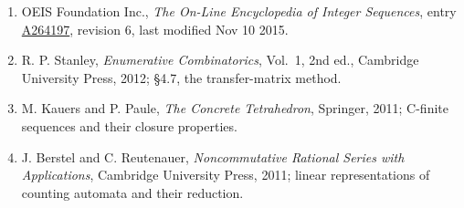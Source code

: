 \documentclass[11pt]{article}
\theoremstyle{definition}
\begin{document}
\begin{enumerate}

\item OEIS Foundation Inc., \emph{The On-Line Encyclopedia of Integer Sequences}, entry \href{https://oeis.org/A264197}{A264197}, revision 6, last modified Nov 10 2015.

\item R. P. Stanley, \emph{Enumerative Combinatorics}, Vol.~1, 2nd ed., Cambridge University Press, 2012; \S4.7, the transfer-matrix method.

\item M. Kauers and P. Paule, \emph{The Concrete Tetrahedron}, Springer, 2011; C-finite sequences and their closure properties.

\item J. Berstel and C. Reutenauer, \emph{Noncommutative Rational Series with Applications}, Cambridge University Press, 2011; linear representations of counting automata and their reduction.

\end{enumerate}
\end{document}
